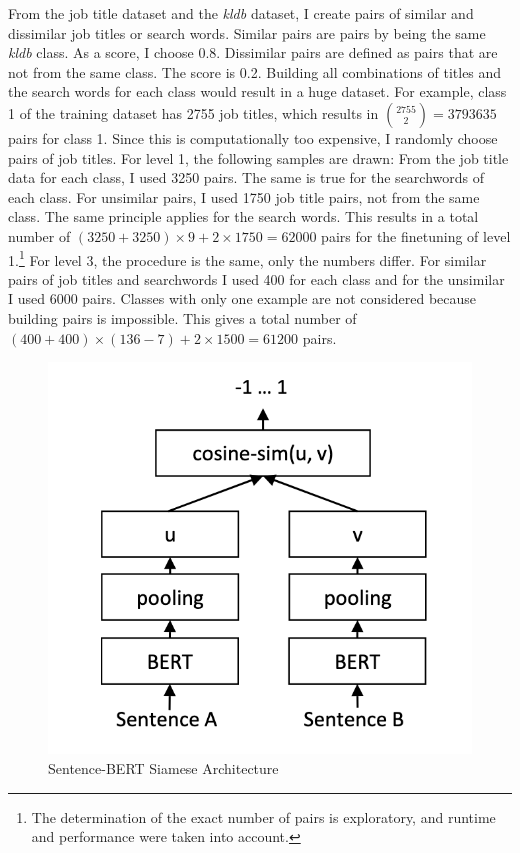 \documentclass[12pt, a4paper, titlepage]{article}
\begin{document}
From the job title dataset and the \textit{kldb} dataset, I create pairs of similar and dissimilar job titles or search words. Similar pairs are pairs by being the same \textit{kldb} class. As a score, I choose 0.8. Dissimilar pairs are defined as pairs that are not from the same class. The score is 0.2. Building all combinations of titles and the search words for each class would result in a huge dataset. For example, class 1 of the training dataset has 2755 job titles, which results in ${2755 \choose 2} = 3793635$ pairs for class 1. Since this is computationally too expensive, I randomly choose pairs of job titles. For level 1, the following samples are drawn: From the job title data for each class, I used 3250 pairs. The same is true for the searchwords of each class. For unsimilar pairs, I used 1750 job title pairs, not from the same class. The same principle applies for the search words. This results in a total number of $(3250+3250) \times 9 + 2 \times 1750 = 62000$ pairs for the finetuning of level 1.\footnote{The determination of the exact number of pairs is exploratory, and runtime and performance were taken into account.} For level 3, the procedure is the same, only the numbers differ. For similar pairs of job titles and searchwords I used 400 for each class and for the unsimilar I used 6000 pairs. Classes with only one example are not considered because building pairs is impossible. This gives a total number of $(400 + 400) \times (136-7) + 2 \times 1500 =  61200$ pairs. 

\begin{figure}[hb!]
  \center
  \includegraphics[scale=0.5]{SBERT.png}
  \caption[Sentence-BERT Siamese Structure]{\label{fig: F5} Sentence-\ac{BERT} Siamese Architecture \citep[3]{reimers2019}}
\end{figure}
\end{document}
